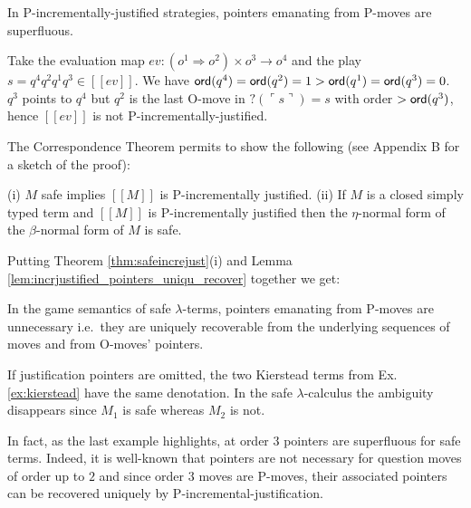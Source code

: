 \documentclass{llncs}
\newcommand\ord[1]{{\sf ord}(#1)}
\newcommand{\sem}[1]{{[\![ #1 ]\!]}}
\newcommand{\pview}[1]{\ulcorner #1 \urcorner}
\begin{document}
\begin{lemma}
\label{lem:incrjustified_pointers_uniqu_recover} In P-incrementally-justified strategies, pointers emanating from P-moves are superfluous.
\end{lemma}

\begin{example}
Take the evaluation map $ev : (o^1 \Rightarrow o^2) \times  o^3 \rightarrow o^4$ and
the play $s = q^4 q^2 q^1 q^3 \in \sem{ev}$. We have $\ord{q^4} = \ord{q^2} = 1 > \ord{q^1} = \ord{q^3} = 0$.
$q^3$ points to $q^4$ but $q^2$ is the last O-move in $?(\pview{s})= s$
with order $>\ord{q^3}$, hence $\sem{ev}$ is not P-incrementally-justified.
\end{example}

The Correspondence Theorem permits to show the following (see Appendix B for a sketch of the proof):

\begin{theorem}
\label{thm:safeincrejust}
(i) $M$ safe implies $\sem{M}$ is P-incrementally justified.
(ii) If $M$ is a closed simply typed term and $\sem{M}$ is P-incrementally justified then the $\eta$-normal form of the $\beta$-normal form  of $M$ is safe.
\end{theorem}



Putting Theorem \ref{thm:safeincrejust}(i)
and Lemma \ref{lem:incrjustified_pointers_uniqu_recover} together
we get:
\begin{proposition}
\label{prop:safe_ptr_recoverable} In the game semantics of
safe $\lambda$-terms, pointers emanating from P-moves are
unnecessary i.e.\ they are uniquely recoverable from the underlying sequences of moves and from O-moves' pointers.
\end{proposition}

\begin{example} If justification pointers are omitted, the two Kierstead terms from Ex. \ref{ex:kierstead} have
the same denotation. In the safe $\lambda$-calculus the ambiguity disappears since $M_1$ is safe whereas $M_2$ is not.
\end{example}

In fact, as the last example highlights, at order $3$ pointers are superfluous for safe terms. Indeed, it is well-known that  pointers are not necessary for question moves of order up to $2$ and since order $3$ moves are P-moves, their associated pointers can be recovered uniquely by P-incremental-justification.
\end{document}
